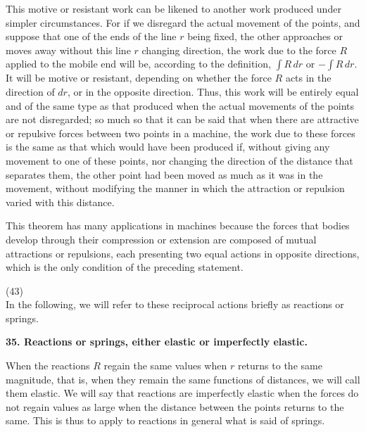 \documentclass{book}
\begin{document}
This motive or resistant work can be likened to another work produced under simpler circumstances. For if we disregard the actual movement of the points, and suppose that one of the ends of the line \( r \) being fixed, the other approaches or moves away without this line \( r \) changing direction, the work due to the force \( R \) applied to the mobile end will be, according to the definition, \( \int R \, dr \) or \( -\int R \, dr \). It will be motive or resistant, depending on whether the force \( R \) acts in the direction of \( dr \), or in the opposite direction. Thus, this work will be entirely equal and of the same type as that produced when the actual movements of the points are not disregarded; so much so that it can be said that when there are attractive or repulsive forces between two points in a machine, the work due to these forces is the same as that which would have been produced if, without giving any movement to one of these points, nor changing the direction of the distance that separates them, the other point had been moved as much as it was in the movement, without modifying the manner in which the attraction or repulsion varied with this distance.

This theorem has many applications in machines because the forces that bodies develop through their compression or extension are composed of mutual attractions or repulsions, each presenting two equal actions in opposite directions, which is the only condition of the preceding statement.

\newpage
(43) \\
In the following, we will refer to these reciprocal actions briefly as reactions or springs.

\vspace{4mm}
\textbf{35. Reactions or springs, either elastic or imperfectly elastic.
}
\vspace{4mm} 


When the reactions \( R \) regain the same values when \( r \) returns to the same magnitude, that is, when they remain the same functions of distances, we will call them elastic. We will say that reactions are imperfectly elastic when the forces do not regain values as large when the distance between the points returns to the same. This is thus to apply to reactions in general what is said of springs.
\end{document}
